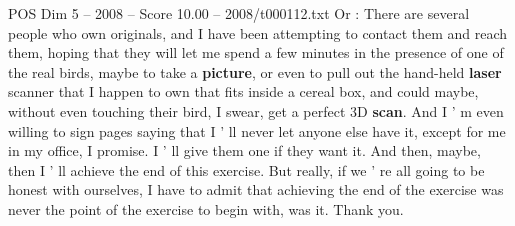 \begin{textsample}{POS Dim 5 – 2008 – Score 10.00 – 2008/t000112.txt}
Or : There are several people who own originals, and I have been attempting to contact them and reach them, hoping that they will let me spend a few minutes in the presence of one of the real birds, maybe to take a \textbf{picture}, or even to pull out the hand-held \textbf{laser} scanner that I happen to own that fits inside a cereal box, and could maybe, without even touching their bird, I swear, get a perfect 3D \textbf{scan}.
And I ' m even willing to sign pages saying that I ' ll never let anyone else have it, except for me in my office, I promise.
I ' ll give them one if they want it.
And then, maybe, then I ' ll achieve the end of this exercise.
But really, if we ' re all going to be honest with ourselves, I have to admit that achieving the end of the exercise was never the point of the exercise to begin with, was it.
Thank you.

\end{textsample}
